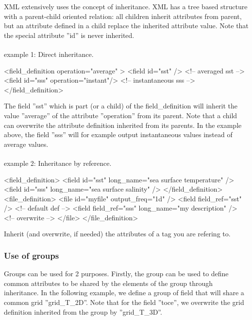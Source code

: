 \documentclass[../tex_main/NEMO_manual]{subfiles}
\begin{document}
XML extensively uses the concept of inheritance.
XML has a tree based structure with a parent-child oriented relation: 
all children inherit attributes from parent, but an attribute defined in a child replace 
the inherited attribute value. 
Note that the special attribute ''id'' is never inherited. \\ \\
example 1: Direct inheritance.

\begin{xmllines}
<field_definition operation="average" >
	<field id="sst"                    />   <!-- averaged      sst --> 
	<field id="sss" operation="instant"/>   <!-- instantaneous sss --> 
</field_definition> 
\end{xmllines}

The field ''sst'' which is part (or a child) of the field\_definition will inherit the value ''average'' 
of the attribute ''operation'' from its parent.
Note that a child can overwrite the attribute definition inherited from its parents.
In the example above, the field ''sss'' will for example output instantaneous values instead of 
average values. \\ \\
example 2: Inheritance by reference.

\begin{xmllines}
<field_definition>
	<field id="sst" long_name="sea surface temperature" />
	<field id="sss" long_name="sea surface salinity"    />
</field_definition>
<file_definition>
	<file id="myfile" output_freq="1d" />   
		<field field_ref="sst"                            />  <!-- default def -->
		<field field_ref="sss" long_name="my description" />  <!-- overwrite   -->
	</file>
</file_definition> 
\end{xmllines}

Inherit (and overwrite, if needed) the attributes of a tag you are refering to.

\subsubsection{Use of groups}

Groups can be used for 2 purposes.
Firstly, the group can be used to define common attributes to be shared by the elements of 
the group through inheritance.
In the following example, we define a group of field that will share a common grid ''grid\_T\_2D''.
Note that for the field ''toce'', we overwrite the grid definition inherited from the group by 
''grid\_T\_3D''.
\end{document}
